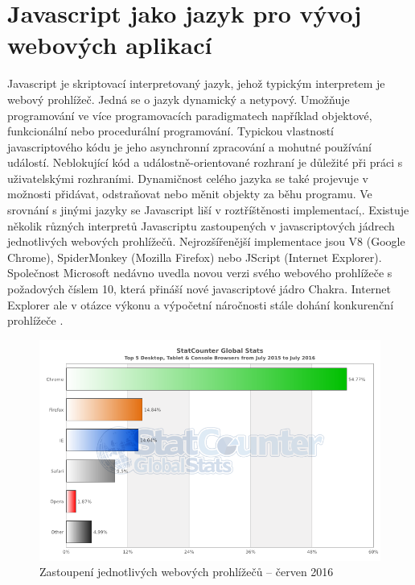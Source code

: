 \chapter{Javascript jako jazyk pro vývoj webových aplikací}
Javascript je skriptovací interpretovaný jazyk, jehož typickým interpretem je webový prohlížeč. Jedná se o jazyk dynamický a netypový. Umožňuje programování ve více programovacích paradigmatech například objektové, funkcionální nebo procedurální programování. Typickou vlastností javascriptového kódu je jeho asynchronní zpracování a mohutné používání událostí. Neblokující kód a událostně-orientované rozhraní je důležité při práci s uživatelskými rozhraními. Dynamičnost celého jazyka se také projevuje v možnosti přidávat, odstraňovat nebo měnit objekty za běhu programu. Ve srovnání s jinými jazyky se Javascript liší v roztříštěnosti implementací,. Existuje několik různých interpretů Javascriptu zastoupených v javascriptových jádrech jednotlivých webových prohlížečů. Nejrozšířenější implementace jsou V8 (Google Chrome), SpiderMonkey (Mozilla Firefox) nebo JScript (Internet Explorer). Společnost Microsoft nedávno uvedla novou verzi svého webového prohlížeče s požadových číslem 10, která přináší nové javascriptové jádro Chakra. Internet Explorer ale v otázce výkonu a výpočetní náročnosti stále dohání konkurenční prohlížeče \cite{zakas_js} \cite{flanagan_javascript}.
\begin{figure}[h]
\begin{centering}
\includegraphics[scale=0.5]{obrazky/browsers}
\par\end{centering}
\caption{Zastoupení jednotlivých webových prohlížečů – červen 2016 \cite{statcounter} \label{fig:browsers}}
\end{figure}
